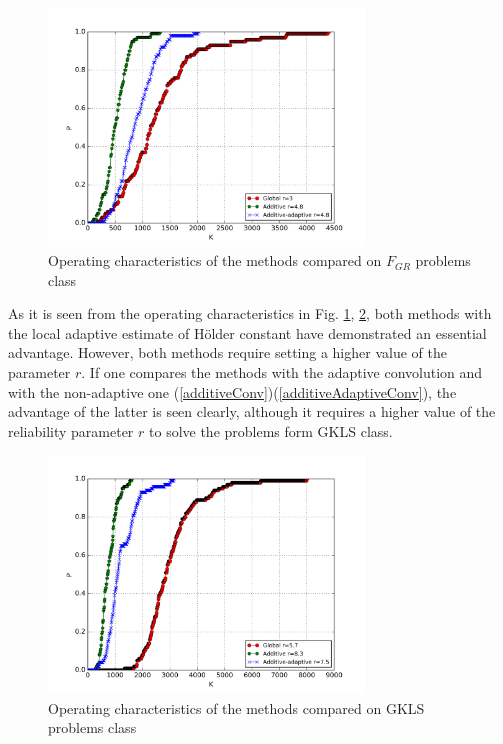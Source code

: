 \documentclass[procedia]{easychair}
\begin{document}
\begin{figure}[ht]
  	\center
    \includegraphics[width=0.75\textwidth]{images/grishagin.png}
    \caption{Operating characteristics of the methods compared on \(F_{GR}\) problems class}
    \label{fig:grishh_op}
  \end{figure}
As it is seen from the operating characteristics in Fig. \ref{fig:grishh_op}, \ref{fig:gkls_op}, both methods with the
local adaptive estimate of Hölder constant have demonstrated an essential advantage.
However, both methods require setting a higher value of the parameter \(r\). If one compares the
methods with the adaptive convolution and  with the non-adaptive one (\ref{additiveConv})(\ref{additiveAdaptiveConv}), the advantage
of the latter is seen clearly, although it requires a higher value of the reliability
parameter \(r\) to solve the problems form GKLS class.
  \begin{figure}[ht]
  	\center
    \includegraphics[width=0.75\textwidth]{images/gkls-s.png}
    \caption{Operating characteristics of the methods compared on GKLS problems class}
    \label{fig:gkls_op}
  \end{figure}
\end{document}
